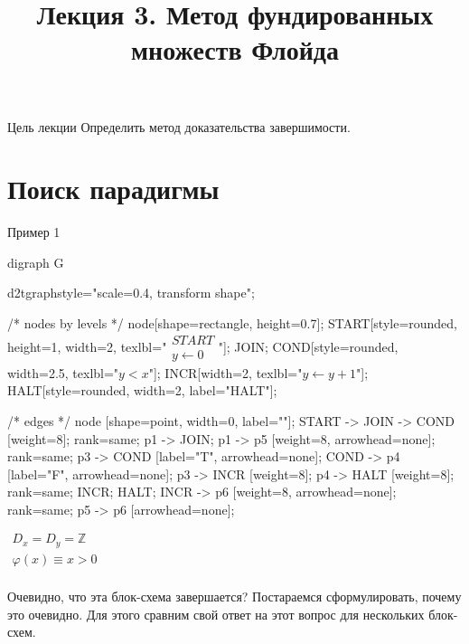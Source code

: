 \documentclass[hyperref={unicode=true}]{beamer}
\title{Лекция 3. Метод фундированных множеств Флойда}
\author{}
\date{}
\begin{document}
	\begin{frame}{}
		\titlepage
	\end{frame}

    \begin{frame}{Цель лекции}
    Определить метод доказательства завершимости.
    \end{frame}

    \section{Поиск парадигмы}

    \begin{frame}[fragile]{Пример 1}
    \begin{multicols}{2}
	\huge
	\begin{dot2tex}[options=-traw]
	digraph G{
		d2tgraphstyle="scale=0.4, transform shape";

		/* nodes by levels */
		node[shape=rectangle, height=0.7];
		START[style=rounded, height=1, width=2, texlbl="$\begin{matrix}START\\ y \leftarrow 0\end{matrix}$"];
		JOIN;
        COND[style=rounded, width=2.5, texlbl="$y < x$"];
		INCR[width=2, texlbl="$y \leftarrow y + 1$"];
        HALT[style=rounded, width=2, label="HALT"];

		/* edges */
		node [shape=point, width=0, label=""];
		START -> JOIN -> COND [weight=8];
		{ rank=same; p1 -> JOIN; }
		p1 -> p5 [weight=8, arrowhead=none];
		{ rank=same; p3 -> COND [label="T", arrowhead=none];
                     COND -> p4 [label="F", arrowhead=none]; }
		p3 -> INCR [weight=8];
		p4 -> HALT [weight=8];
		{ rank=same; INCR; HALT; }
		INCR -> p6 [weight=8, arrowhead=none];
		{ rank=same; p5 -> p6 [arrowhead=none]; }
        }
	\end{dot2tex}

	\normalsize

    $\begin{matrix}
    D_x = D_y = \mathbb{Z}\\
    \varphi(x) \equiv x > 0\\
    \end{matrix}$

    Очевидно, что эта блок-схема завершается? Постараемся
    сформулировать, почему это очевидно. Для этого
    сравним свой ответ на этот вопрос для нескольких блок-схем.
    \end{multicols}
    \end{frame}
\end{document}
